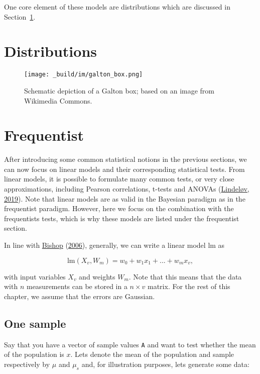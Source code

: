 \documentclass[
  14pt
  american,
  paper=a4,
  ,captions=tableheading
]{scrbook}
\newcommand{\passthrough}[1]{#1}
\begin{document}
One core element of these models are distributions which are discussed
in Section~\ref{sec:distributions}.

\hypertarget{sec:distributions}{%
\section{Distributions}\label{sec:distributions}}

\begin{figure}
\hypertarget{fig:galton_box}{%
\centering
\texttt{[image: \_build/im/galton\_box.png]}
\caption{Schematic depiction of a Galton box; based on an image from
Wikimedia Commons.}\label{fig:galton_box}
}
\end{figure}

\hypertarget{sec:freq}{%
\section{Frequentist}\label{sec:freq}}

After introducing some common statistical notions in the previous
sections, we can now focus on linear models and their corresponding
statistical tests. From linear models, it is possible to formulate many
common tests, or very close approximations, including Pearson
correlations, t-tests and ANOVAs
(\protect\hyperlink{ref-lindelov2019common}{Lindeløv, 2019}). Note that
linear models are as valid in the Bayesian paradigm as in the
frequentist paradigm. However, here we focus on the combination with the
frequentists tests, which is why these models are listed under the
frequentist section.

In line with \protect\hyperlink{ref-bishop2006pattern}{Bishop}
(\protect\hyperlink{ref-bishop2006pattern}{2006}), generally, we can
write a linear model \(\text{lm}\) as

\[ \text{lm}(X_{v}, W_{m}) = w_0 + w_1 x_1 + ... + w_m x_v, \]

with input variables \(X_v\) and weights \(W_m\). Note that this means
that the data with \(n\) measurements can be stored in a \(n \times v\)
matrix. For the rest of this chapter, we assume that the errors are
Gaussian.

\hypertarget{one-sample}{%
\subsection{One sample}\label{one-sample}}

Say that you have a vector of sample values \passthrough{\lstinline!A!}
and want to test whether the mean of the population is \(x\). Lets
denote the mean of the population and sample respectively by \(\mu\) and
\(\mu_s\) and, for illustration purposes, lets generate some data:
\end{document}
